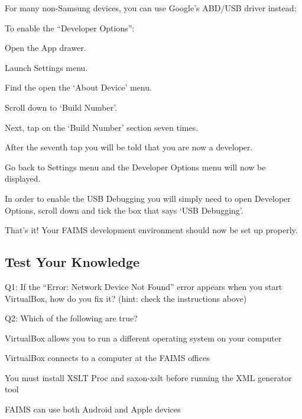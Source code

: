 \from[url18]

For many non-Samsung devices, you can use Google's ABD/USB driver instead: \from[url19]

To enable the “Developer Options”:

\startitemize[n][stopper=.]
\item
  \startblockquote
  Open the App drawer.
  \stopblockquote
\item
  \startblockquote
  Launch Settings menu.
  \stopblockquote
\item
  \startblockquote
  Find the open the ‘About Device' menu.
  \stopblockquote
\item
  \startblockquote
  Scroll down to ‘Build Number'.
  \stopblockquote
\item
  \startblockquote
  Next, tap on the ‘Build Number' section seven times.
  \stopblockquote
\item
  \startblockquote
  After the seventh tap you will be told that you are now a developer.
  \stopblockquote
\item
  \startblockquote
  Go back to Settings menu and the Developer Options menu will now be displayed.
  \stopblockquote
\stopitemize

In order to enable the USB Debugging you will simply need to open Developer Options, scroll down and tick the box that says ‘USB Debugging'.

That's it! Your FAIMS development environment should now be set up properly.

\subsection[test-your-knowledge-1]{Test Your Knowledge}

Q1: If the “Error: Network Device Not Found” error appears when you start VirtualBox, how do you fix it? (hint: check the instructions above)

Q2: Which of the following are true?

\startitemize
\item
  \startblockquote
  VirtualBox allows you to run a different operating system on your computer
  \stopblockquote
\item
  \startblockquote
  VirtualBox connects to a computer at the FAIMS offices
  \stopblockquote
\item
  \startblockquote
  You must install XSLT Proc and saxon-xslt before running the XML generator tool
  \stopblockquote
\item
  \startblockquote
  FAIMS can use both Android and Apple devices
  \stopblockquote
\stopitemize

